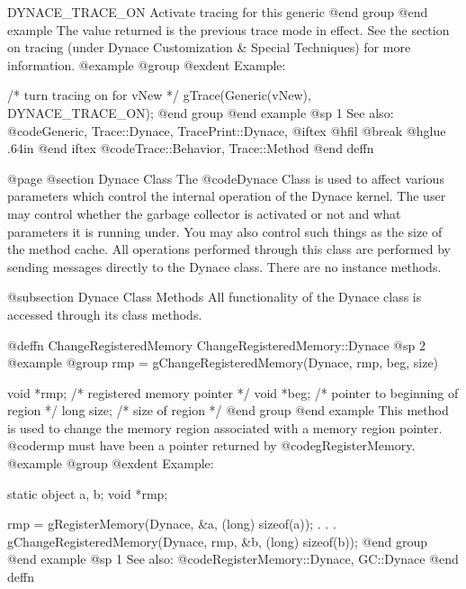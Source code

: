 DYNACE_TRACE_ON          Activate tracing for this generic
@end group
@end example
The value returned is the previous trace mode in effect.  See the
section on tracing (under Dynace Customization & Special Techniques) for
more information.
@example
@group
@exdent Example:

/* turn tracing on for vNew */
gTrace(Generic(vNew), DYNACE_TRACE_ON); 
@end group
@end example
@sp 1
See also:  @code{Generic, Trace::Dynace, TracePrint::Dynace,}
@iftex
@hfil @break @hglue .64in 
@end iftex
@code{Trace::Behavior, Trace::Method}
@end deffn















@page
@section Dynace Class
The @code{Dynace} Class is used to affect various parameters which control
the internal operation of the Dynace kernel.  The user may control whether
the garbage collector is activated or not and what parameters it is
running under.  You may also control such things as the size of the
method cache.  All operations performed through this class are performed
by sending messages directly to the Dynace class.  There are no instance
methods.


@subsection Dynace Class Methods
All functionality of the Dynace class is accessed through its class methods.







@deffn {ChangeRegisteredMemory} ChangeRegisteredMemory::Dynace
@sp 2
@example
@group
rmp = gChangeRegisteredMemory(Dynace, rmp, beg, size)

void    *rmp;   /*  registered memory pointer  */
void    *beg;   /*  pointer to beginning of region  */
long    size;   /*  size of region  */
@end group
@end example
This method is used to change the memory region associated with
a memory region pointer.  @code{rmp} must have been a pointer returned by
@code{gRegisterMemory}.
@example
@group
@exdent Example:

static  object  a, b;
void    *rmp;

rmp = gRegisterMemory(Dynace, &a, (long) sizeof(a));
   .
   .
   .
gChangeRegisteredMemory(Dynace, rmp, &b, (long) sizeof(b));
@end group
@end example
@sp 1
See also:  @code{RegisterMemory::Dynace, GC::Dynace}
@end deffn








